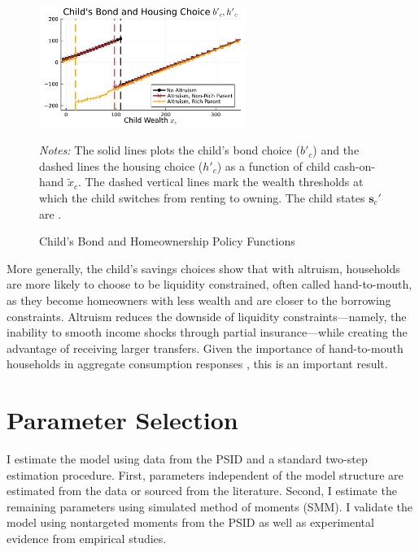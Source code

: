 \documentclass[12pt]{article}
\begin{document}
\begin{figure}
	\begin{center} 
	\caption{Child's Bond and Homeownership Policy Functions}\label{fig:pol}
	\includegraphics[width=0.6\textwidth]{../tabfig/model/pol_bond.pdf}
	\end{center}
	{\vspace{-0.2in}\begin{footnotesize}\textit{Notes:} The solid lines plots the child’s bond choice ($b'_c$) and the dashed lines the housing choice ($h'_c$) as a function of child cash-on-hand $\tilde x_c$. The dashed vertical lines mark the wealth thresholds at which the child switches from renting to owning. The child states $\mathbf{s}_c'$ are \unskip. \end{footnotesize}}
\end{figure}

More generally, the child's savings choices show that with altruism, households are more likely to choose to be liquidity constrained, often called hand-to-mouth, as they become homeowners with less wealth and are closer to the borrowing constraints. Altruism reduces the downside of liquidity constraints---namely, the inability to smooth income shocks through partial insurance---while creating the advantage of receiving larger transfers. Given the importance of hand-to-mouth households in aggregate consumption responses \citep[see, e.g.,][]{Kaplan2014a,Boar2020}, this is an important result.

\section{Parameter Selection}\label{sec:estimation}
I estimate the model using data from the PSID and a standard two-step estimation procedure. First, parameters independent of the model structure are estimated from the data or sourced from the literature. Second, I estimate the remaining parameters using simulated method of moments (SMM). I validate the model using nontargeted moments from the PSID as well as experimental evidence from empirical studies. 
\end{document}
